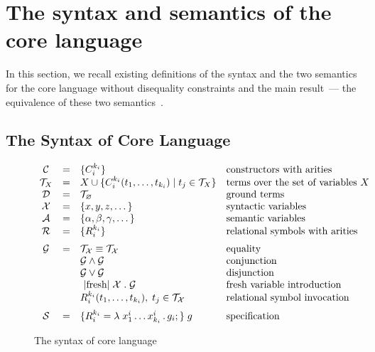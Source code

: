 \section{The syntax and semantics of the core language}
\label{sec:review}

In this section, we recall existing definitions of the syntax and the two semantics for the core language without disequality constraints and the main result~--- the equivalence
of these two semantics~\cite{CertifiedSemantics}.

\subsection{The Syntax of Core Language}
\label{subsec_syntax}

\begin{figure}[t]
\centering
\[
\begin{array}{ccll}
  \mathcal{C} & = & \{C_i^{k_i}\} & \mbox{constructors with arities} \\
  \mathcal{T}_X & = & X \cup \{C_i^{k_i} (t_1, \dots, t_{k_i}) \mid t_j\in\mathcal{T}_X\} & \mbox{terms over the set of variables $X$} \\
  \mathcal{D} & = & \mathcal{T}_\emptyset & \mbox{ground terms}\\
  \mathcal{X} & = & \{ x, y, z, \dots \} & \mbox{syntactic variables} \\
  \mathcal{A} & = & \{ \alpha, \beta, \gamma, \dots \} & \mbox{semantic variables} \\
  \mathcal{R} & = & \{ R_i^{k_i}\} &\mbox{relational symbols with arities} \\[2mm]
  \mathcal{G} & = & \mathcal{T_X}\equiv\mathcal{T_X}   &  \mbox{equality} \\
              &   & \mathcal{G}\wedge\mathcal{G}     & \mbox{conjunction} \\
              &   & \mathcal{G}\vee\mathcal{G}       &\mbox{disjunction} \\
              &   & \mbox{\lstinline|fresh|}\;\mathcal{X}\;.\;\mathcal{G} & \mbox{fresh variable introduction} \\
              &   & R_i^{k_i} (t_1,\dots,t_{k_i}),\;t_j\in\mathcal{T_X} & \mbox{relational symbol invocation} \\[2mm]
  \mathcal{S} & = & \{R_i^{k_i} = \lambda\;x_1^i\dots x_{k_i}^i\,.\, g_i;\}\; g & \mbox{specification}
\end{array}
\]
\caption{The syntax of core language}
\label{syntax}
\end{figure}

